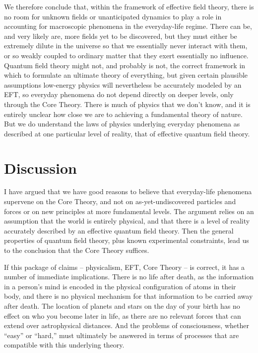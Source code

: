\documentclass[12pt,letterpaper]{article}
\begin{document}
We therefore conclude that, within the framework of effective field theory, there is no room for unknown fields or unanticipated dynamics to play a role in accounting for macroscopic phenomena in the everyday-life regime.
There can be, and very likely are, more fields yet to be discovered, but they must either be extremely dilute in the universe so that we essentially never interact with them, or so weakly coupled to ordinary matter that they exert essentially no influence.
Quantum field theory might not, and probably is not, the correct framework in which to formulate an ultimate theory of everything, but given certain plausible assumptions low-energy physics will nevertheless be accurately modeled by an EFT, so everyday phenomena do not depend directly on deeper levels, only through the Core Theory.
There is much of physics that we don't know, and it is entirely unclear how close we are to achieving a fundamental theory of nature.
But we do understand the laws of physics underlying everyday phenomena as described at one particular level of reality, that of effective quantum field theory.


\section{Discussion}

I have argued that we have good reasons to believe that everyday-life phenomena supervene on the Core Theory, and not on as-yet-undiscovered particles and forces or on new principles at more fundamental levels.
The argument relies on an assumption that the world is entirely physical, and that there is a level of reality accurately described by an effective quantum field theory.
Then the general properties of quantum field theory, plus known experimental constraints, lead us to the conclusion that the Core Theory suffices.

If this package of claims -- physicalism, EFT, Core Theory -- is correct, it has a number of immediate implications.
There is no life after death, as the information in a person's mind is encoded in the physical configuration of atoms in their body, and there is no physical mechanism for that information to be carried away after death.
The location of planets and stars on the day of your birth has no effect on who you become later in life, as there are no relevant forces that can extend over astrophysical distances.
And the problems of consciousness, whether ``easy'' or ``hard,'' must ultimately be answered in terms of processes that are compatible with this underlying theory.
\end{document}
